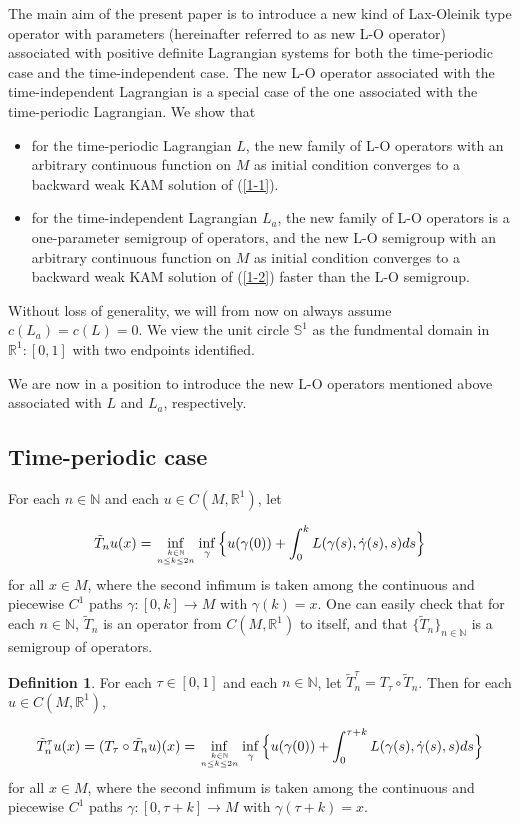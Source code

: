 \documentclass{amsart}[12pt]
\theoremstyle{definition}
\newtheorem{definition}[theorem]{Definition}
\theoremstyle{remark}
\numberwithin{equation}{section}
\begin{document}
The main aim of the present paper is to introduce a new kind of
Lax-Oleinik type operator with parameters (hereinafter referred to
as new L-O operator) associated with positive definite Lagrangian
systems for both the time-periodic case and the time-independent
case. The new L-O operator associated with the time-independent
Lagrangian is a special case of the one associated with the
time-periodic Lagrangian. We show that

\begin{itemize}
    \item   for the time-periodic Lagrangian $L$, the new family of
            L-O operators with an arbitrary continuous function on $M$ as initial
            condition converges to a backward weak KAM solution of
            (\ref{1-1}).
    \item   for the time-independent Lagrangian $L_a$, the new family of
            L-O operators is a one-parameter semigroup of
            operators, and the new L-O semigroup with an arbitrary continuous function on $M$ as initial
            condition converges to a backward weak KAM solution of
            (\ref{1-2}) faster than the L-O semigroup.
\end{itemize}

Without loss of generality, we will from now on always assume
$c(L_a)=c(L)=0$. We view the unit circle $\mathbb{S}^1$ as the
fundmental domain in $\mathbb{R}^1: [0,1]$ with two endpoints
identified.

We are now in a position to introduce the new L-O operators
mentioned above associated with $L$ and $L_a$, respectively.

\subsection{Time-periodic case}
For each $n\in\mathbb{N}$ and each $u\in C(M,\mathbb{R}^1)$, let

\[
\tilde{T}_nu(x)=\inf_{k\in\mathbb{N} \atop n\leq k\leq
2n}\inf_{\gamma}\Big\{u(\gamma(0))+\int_{0}^k
L(\gamma(s),\dot{\gamma}(s),s)ds\Big\}
\]
for all $x\in M$, where the second infimum is taken among the
continuous and piecewise $C^1$ paths $\gamma:[0,k]\rightarrow M$
with $\gamma(k)=x$. One can easily check that for each
$n\in\mathbb{N}$, $\tilde{T}_n$ is an operator from
$C(M,\mathbb{R}^1)$ to itself, and that
$\{\tilde{T}_n\}_{n\in\mathbb{N}}$ is a semigroup of operators.

\begin{definition}\label{def1}
For each $\tau\in[0,1]$ and each $n\in \mathbb{N}$, let
$\tilde{T}_n^\tau=T_\tau\circ\tilde{T}_n$. Then for each $u\in
C(M,\mathbb{R}^1)$,

\[
\tilde{T}_n^\tau u(x)=(T_\tau\circ\tilde{T}_nu)(x)=
\inf_{k\in\mathbb{N} \atop n\leq k\leq
2n}\inf_{\gamma}\Big\{u(\gamma(0))+\int_{0}^{\tau+k}
L(\gamma(s),\dot{\gamma}(s),s)ds\Big\}
\]
for all $x\in M$, where the second infimum is taken among the
continuous and piecewise $C^1$ paths $\gamma:[0,\tau+k]\rightarrow
M$ with $\gamma(\tau+k)=x$.
\end{definition}
\end{document}
